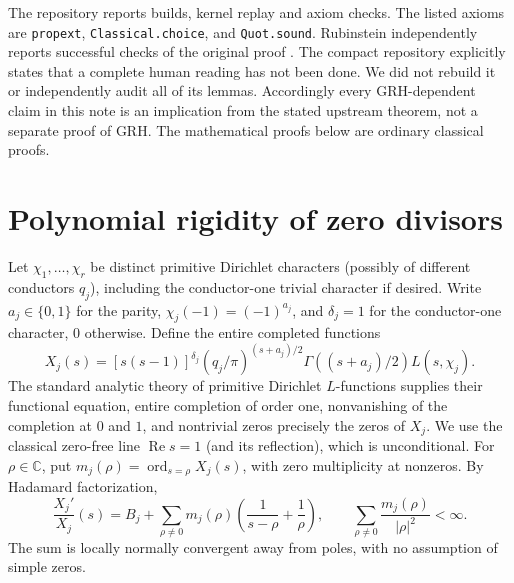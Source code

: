 \documentclass[11pt]{article}
\theoremstyle{remark}\newtheorem{remark}[theorem]{Remark}
\newcommand{\C}{\mathbb C}\newcommand{\R}{\mathbb R}\newcommand{\dd}{\mathrm d}\newcommand{\Rea}{\operatorname{Re}}\newcommand{\ord}{\operatorname{ord}}\newcommand{\diag}{\operatorname{diag}}\newcommand{\Span}{\operatorname{span}}
\begin{document}
The repository reports builds, kernel replay and axiom checks. The listed axioms are \texttt{propext}, \texttt{Classical.choice}, and \texttt{Quot.sound}. Rubinstein independently reports successful checks of the original proof \cite{rub}. The compact repository explicitly states that a complete human reading has not been done. We did not rebuild it or independently audit all of its lemmas. Accordingly every GRH-dependent claim in this note is an implication from the stated upstream theorem, not a separate proof of GRH. The mathematical proofs below are ordinary classical proofs.

\section{Polynomial rigidity of zero divisors}
Let $\chi_1,\dots,\chi_r$ be distinct primitive Dirichlet characters (possibly of different conductors $q_j$), including the conductor-one trivial character if desired. Write $a_j\in\{0,1\}$ for the parity, $\chi_j(-1)=(-1)^{a_j}$, and $\delta_j=1$ for the conductor-one character, $0$ otherwise. Define the entire completed functions
\[
 X_j(s)=[s(s-1)]^{\delta_j}(q_j/\pi)^{(s+a_j)/2}
 \Gamma((s+a_j)/2)L(s,\chi_j).
\]
The standard analytic theory of primitive Dirichlet $L$-functions \cite{dav,ik} supplies their functional equation, entire completion of order one, nonvanishing of the completion at $0$ and $1$, and nontrivial zeros precisely the zeros of $X_j$. We use the classical zero-free line $\Rea s=1$ (and its reflection), which is unconditional. For $\rho\in\C$, put $m_j(\rho)=\ord_{s=\rho}X_j(s)$, with zero multiplicity at nonzeros. By Hadamard factorization,
\begin{equation}\label{had}
 \frac{X_j'}{X_j}(s)=B_j+\sum_{\rho\ne0} m_j(\rho)\left(\frac1{s-\rho}+\frac1\rho\right),\qquad
 \sum_{\rho\ne0}\frac{m_j(\rho)}{|\rho|^2}<\infty.
\end{equation}
The sum is locally normally convergent away from poles, with no assumption of simple zeros.
\end{document}
